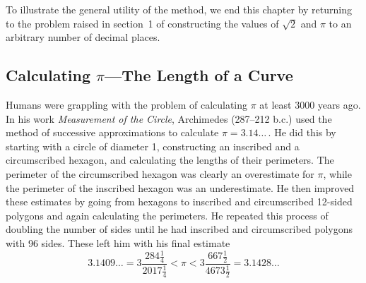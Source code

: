 To illustrate the general utility of the method, we end this chapter
 by returning to the problem raised in section~1 of constructing the
 values of $\sqrt{2}$ and $\pi$ to an arbitrary number of decimal
 places.

\subsection{Calculating $\pi$---The Length of a Curve}
\label{subsec:calculating-pi---the-length-of-a-curve}
\label{length-begin}

Humans were grappling with the problem of calculating $\pi$ at least
 3000 years ago.  In his work {\em Measurement of the Circle},
 Archimedes (287--212 {\sc b.c.}) used the method of successive
 approximations to calculate $\pi = 3.14 \ldots \, .$ He did this by
 starting with a circle of diameter 1, constructing an inscribed and a
 circumscribed hexagon, and calculating the lengths of their
 perimeters.  The perimeter of the circumscribed hexagon was clearly
 an overestimate for $\pi$, while the perimeter of the inscribed
 hexagon was an underestimate.  He then improved these estimates by
 going from hexagons to inscribed and circumscribed 12-sided polygons
 and again calculating the perimeters.  He repeated this process of
 doubling the number of sides until he had inscribed and circumscribed
 polygons with 96 sides. These left him with his final estimate
	\[
3.1409\ldots = 
		3\frac{284\frac{1}{4}}{2017\frac{1}{4}} < \pi 
		< 3\frac{667\frac{1}{2}}{4673\frac{1}{2}} =
		3.1428\ldots
\]  

